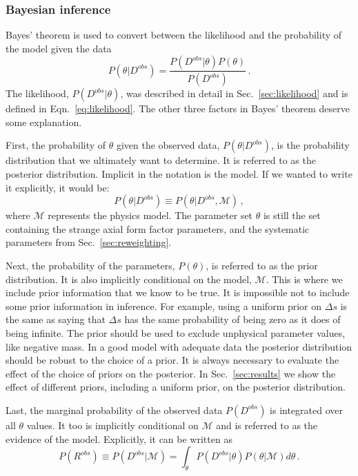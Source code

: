   \subsubsection{Bayesian inference}
    Bayes' theorem is used to convert between the likelihood and the
    probability of the model given the data
    \begin{equation}
      P(\theta|D^{obs}) = \frac{P(D^{obs}|\theta)P(\theta)}{P(D^{obs})} \,.
    \end{equation}
    The likelihood, $P(D^{obs}|\theta)$, was described in detail in
    Sec.~\ref{sec:likelihood} and is defined in Eqn.~\ref{eq:likelihood}. The
    other three factors in Bayes' theorem deserve some explanation.
    
    First, the probability of $\theta$ given the observed data,
    $P(\theta|D^{obs})$, is the probability distribution that we ultimately
    want to determine. It is referred to as the posterior distribution.
    Implicit in the notation is the model. If we wanted to write it explicitly,
    it would be:
    \begin{equation}
      P(\theta|D^{obs})\equiv P(\theta|D^{obs},\mathcal{M}) \,,
    \end{equation}
    where $\mathcal{M}$ represents the physics model. The parameter set
    $\theta$ is still the set containing the strange axial form factor
    parameters, and the systematic parameters from Sec.~\ref{sec:reweighting}.

    Next, the probability of the parameters, $P(\theta)$, is referred to as the
    prior distribution. It is also implicitly conditional on the model,
    $\mathcal{M}$. This is where we include prior information that we know to
    be true. It is impossible not to include some prior information in
    inference. For example, using a uniform prior on $\Delta s$ is the same as
    saying that $\Delta s$ has the same probability of being zero as it does of
    being infinite. The prior should be used to exclude unphysical parameter
    values, like negative mass. In a good model with adequate data the
    posterior distribution should be robust to the choice of a prior. It is
    always necessary to evaluate the effect of the choice of priors on the
    posterior. In Sec.~\ref{sec:results} we show the effect of different
    priors, including a uniform prior, on the posterior distribution.

    Last, the marginal probability of the observed data $P(D^{obs})$ is
    integrated over all $\theta$ values.  It too is implicitly conditional on
    $\mathcal{M}$ and is referred to as the evidence of the model. Explicitly,
    it can be written as
    \begin{equation}
      P(R^{obs}) \equiv P(D^{obs}|\mathcal{M}) 
          = \int_{\theta}P(D^{obs}|\theta)P(\theta|\mathcal{M})d\theta \,.
    \end{equation}

